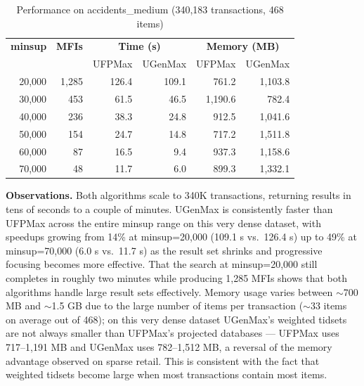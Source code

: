 \documentclass[12pt,a4paper]{report}
\begin{document}
  \begin{table}[h]
    \centering
    \caption{Performance on accidents\_medium (340,183 transactions, 468 items)}
    \label{tab:accidents}
    \begin{tabular}{rrrrrr}
      \toprule
      \textbf{minsup} & \textbf{MFIs} & \multicolumn{2}{c}{\textbf{Time (s)}} & \multicolumn{2}{c}{\textbf{Memory (MB)}} \\
      & & UFPMax & UGenMax & UFPMax & UGenMax \\
      \midrule
      20,000 & 1,285 & 126.4 & 109.1 & 761.2 & 1,103.8 \\
      30,000 & 453 & 61.5 & 46.5 & 1,190.6 & 782.4 \\
      40,000 & 236 & 38.3 & 24.8 & 912.5 & 1,041.6 \\
      50,000 & 154 & 24.7 & 14.8 & 717.2 & 1,511.8 \\
      60,000 & 87 & 16.5 & 9.4 & 937.3 & 1,158.6 \\
      70,000 & 48 & 11.7 & 6.0 & 899.3 & 1,332.1 \\
      \bottomrule
    \end{tabular}
  \end{table}

  \textbf{Observations.} Both algorithms scale to 340K transactions, returning results in tens of seconds to a couple of minutes. UGenMax is consistently faster than UFPMax across the entire minsup range on this very dense dataset, with speedups growing from 14\% at minsup=20,000 (109.1 s vs.\ 126.4 s) up to 49\% at minsup=70,000 (6.0 s vs.\ 11.7 s) as the result set shrinks and progressive focusing becomes more effective. That the search at minsup=20,000 still completes in roughly two minutes while producing 1,285 MFIs shows that both algorithms handle large result sets effectively. Memory usage varies between $\sim$700 MB and $\sim$1.5 GB due to the large number of items per transaction ($\sim$33 items on average out of 468); on this very dense dataset UGenMax's weighted tidsets are not always smaller than UFPMax's projected databases --- UFPMax uses 717--1,191 MB and UGenMax uses 782--1,512 MB, a reversal of the memory advantage observed on sparse retail. This is consistent with the fact that weighted tidsets become large when most transactions contain most items.
\end{document}
